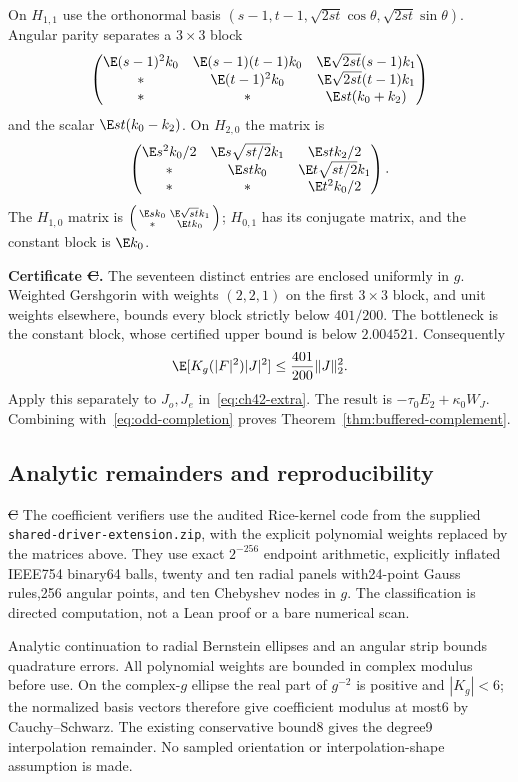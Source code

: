 On $H_{1,1}$ use the orthonormal basis
$(s-1,t-1,\sqrt{2st}\cos\theta,\sqrt{2st}\sin\theta)$. Angular parity separates a $3\times3$ block
\[
 \begin{pmatrix}
 \E(s-1)^2k_0&\E(s-1)(t-1)k_0&\E\sqrt{2st}(s-1)k_1\\
 *&\E(t-1)^2k_0&\E\sqrt{2st}(t-1)k_1\\
 *&*&\E st(k_0+k_2)
 \end{pmatrix}
\]
and the scalar $\E st(k_0-k_2)$. On $H_{2,0}$ the matrix is
\[
 \begin{pmatrix}
 \E s^2k_0/2&\E s\sqrt{st/2}k_1&\E stk_2/2\\
 *&\E stk_0&\E t\sqrt{st/2}k_1\\
 *&*&\E t^2k_0/2
 \end{pmatrix}.
\]
The $H_{1,0}$ matrix is
$\left(\begin{smallmatrix}\E sk_0&\E\sqrt{st}k_1\\ *&\E tk_0\end{smallmatrix}\right)$;
$H_{0,1}$ has its conjugate matrix, and the constant block is $\E k_0$.

\textbf{Certificate \st{C}.} The seventeen distinct entries are enclosed uniformly in $g$. Weighted Gershgorin with weights $(2,2,1)$ on the first $3\times3$ block, and unit weights elsewhere, bounds every block strictly below $401/200$. The bottleneck is the constant block, whose certified upper bound is below $2.004521$. Consequently
\[
 \E[K_g(|F|^2)|J|^2]\le\frac{401}{200}\|J\|_2^2.
\]
Apply this separately to $J_o,J_e$ in~\eqref{eq:ch42-extra}. The result is
$-\tau_0E_2+\kappa_0W_J$. Combining with~\eqref{eq:odd-completion} proves Theorem~\ref{thm:buffered-complement}.

\subsection{Analytic remainders and reproducibility}
\st{C} The coefficient verifiers use the audited Rice-kernel code from the supplied \texttt{shared-driver-extension.zip}, with the explicit polynomial weights replaced by the matrices above. They use exact $2^{-256}$ endpoint arithmetic, explicitly inflated IEEE754 binary64 balls, twenty and ten radial panels with24-point Gauss rules,256 angular points, and ten Chebyshev nodes in $g$. The classification is directed computation, not a Lean proof or a bare numerical scan.

Analytic continuation to radial Bernstein ellipses and an angular strip bounds quadrature errors. All polynomial weights are bounded in complex modulus before use. On the complex-$g$ ellipse the real part of $g^{-2}$ is positive and $|K_g|<6$; the normalized basis vectors therefore give coefficient modulus at most6 by Cauchy--Schwarz. The existing conservative bound8 gives the degree9 interpolation remainder. No sampled orientation or interpolation-shape assumption is made.

